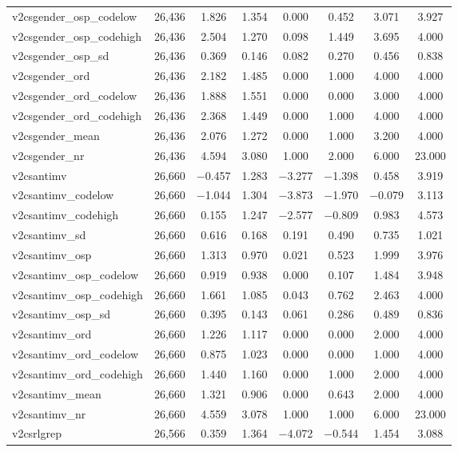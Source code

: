 \begin{table}[!htbp]
\begin{tabular}{@{\extracolsep{5pt}}lccccccc}
v2csgender\_osp\_codelow & 26,436 & 1.826 & 1.354 & 0.000 & 0.452 & 3.071 & 3.927 \\ 
v2csgender\_osp\_codehigh & 26,436 & 2.504 & 1.270 & 0.098 & 1.449 & 3.695 & 4.000 \\ 
v2csgender\_osp\_sd & 26,436 & 0.369 & 0.146 & 0.082 & 0.270 & 0.456 & 0.838 \\ 
v2csgender\_ord & 26,436 & 2.182 & 1.485 & 0.000 & 1.000 & 4.000 & 4.000 \\ 
v2csgender\_ord\_codelow & 26,436 & 1.888 & 1.551 & 0.000 & 0.000 & 3.000 & 4.000 \\ 
v2csgender\_ord\_codehigh & 26,436 & 2.368 & 1.449 & 0.000 & 1.000 & 4.000 & 4.000 \\ 
v2csgender\_mean & 26,436 & 2.076 & 1.272 & 0.000 & 1.000 & 3.200 & 4.000 \\ 
v2csgender\_nr & 26,436 & 4.594 & 3.080 & 1.000 & 2.000 & 6.000 & 23.000 \\ 
v2csantimv & 26,660 & $-$0.457 & 1.283 & $-$3.277 & $-$1.398 & 0.458 & 3.919 \\ 
v2csantimv\_codelow & 26,660 & $-$1.044 & 1.304 & $-$3.873 & $-$1.970 & $-$0.079 & 3.113 \\ 
v2csantimv\_codehigh & 26,660 & 0.155 & 1.247 & $-$2.577 & $-$0.809 & 0.983 & 4.573 \\ 
v2csantimv\_sd & 26,660 & 0.616 & 0.168 & 0.191 & 0.490 & 0.735 & 1.021 \\ 
v2csantimv\_osp & 26,660 & 1.313 & 0.970 & 0.021 & 0.523 & 1.999 & 3.976 \\ 
v2csantimv\_osp\_codelow & 26,660 & 0.919 & 0.938 & 0.000 & 0.107 & 1.484 & 3.948 \\ 
v2csantimv\_osp\_codehigh & 26,660 & 1.661 & 1.085 & 0.043 & 0.762 & 2.463 & 4.000 \\ 
v2csantimv\_osp\_sd & 26,660 & 0.395 & 0.143 & 0.061 & 0.286 & 0.489 & 0.836 \\ 
v2csantimv\_ord & 26,660 & 1.226 & 1.117 & 0.000 & 0.000 & 2.000 & 4.000 \\ 
v2csantimv\_ord\_codelow & 26,660 & 0.875 & 1.023 & 0.000 & 0.000 & 1.000 & 4.000 \\ 
v2csantimv\_ord\_codehigh & 26,660 & 1.440 & 1.160 & 0.000 & 1.000 & 2.000 & 4.000 \\ 
v2csantimv\_mean & 26,660 & 1.321 & 0.906 & 0.000 & 0.643 & 2.000 & 4.000 \\ 
v2csantimv\_nr & 26,660 & 4.559 & 3.078 & 1.000 & 1.000 & 6.000 & 23.000 \\ 
v2csrlgrep & 26,566 & 0.359 & 1.364 & $-$4.072 & $-$0.544 & 1.454 & 3.088 \\ 

\end{tabular}
\end{table}

